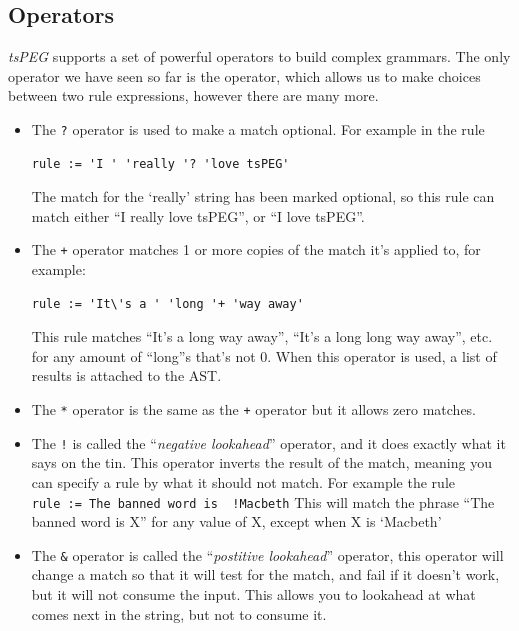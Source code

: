 \hypertarget{operators}{\subsection{Operators}\label{operators}}

\emph{tsPEG} supports a set of powerful operators to build complex
grammars. The only operator we have seen so far is the
\texttt{\textbar{}} operator, which allows us to make choices between
two rule expressions, however there are many more.

\begin{itemize}
\item
  The \texttt{?} operator is used to make a match optional. For example
  in the rule

\begin{verbatim}
rule := 'I ' 'really '? 'love tsPEG'
\end{verbatim}

  The match for the `really' string has been marked optional, so this
  rule can match either ``I really love tsPEG'', or ``I love tsPEG''.
\item
  The \texttt{+} operator matches 1 or more copies of the match it's
  applied to, for example:

\begin{verbatim}
rule := 'It\'s a ' 'long '+ 'way away'
\end{verbatim}

  This rule matches ``It's a long way away'', ``It's a long long way
  away'', etc. for any amount of ``long''s that's not 0. When this
  operator is used, a list of results is attached to the AST.
\item
  The \texttt{*} operator is the same as the \texttt{+} operator but it
  allows zero matches.
\item
  The \texttt{!} is called the ``\emph{negative lookahead}'' operator,
  and it does exactly what it says on the tin. This operator inverts the
  result of the match, meaning you can specify a rule by what it should
  not match. For example the rule
  \texttt{rule\ :=\ \textquotesingle{}The\ banned\ word\ is\ \textquotesingle{}\ !\textquotesingle{}Macbeth\textquotesingle{}}
  This will match the phrase ``The banned word is X'' for any value of
  X, except when X is `Macbeth'
\item
  The \texttt{\&} operator is called the ``\emph{postitive lookahead}''
  operator, this operator will change a match so that it will test for
  the match, and fail if it doesn't work, but it will not consume the
  input. This allows you to lookahead at what comes next in the string,
  but not to consume it.
\end{itemize}

